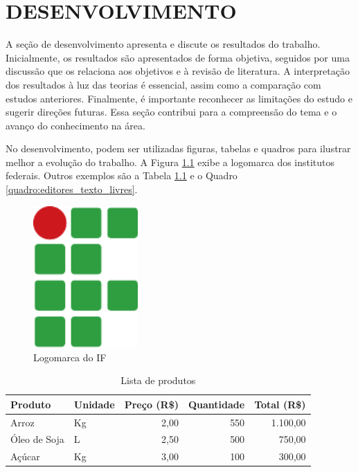 \documentclass{iftex2024}
\begin{document}
\chapter{DESENVOLVIMENTO}

A seção de desenvolvimento apresenta e discute os resultados do trabalho.
Inicialmente, os resultados são apresentados de forma objetiva, seguidos por uma discussão que os relaciona aos objetivos e à revisão de literatura.
A interpretação dos resultados à luz das teorias é essencial, assim como a comparação com estudos anteriores.
Finalmente, é importante reconhecer as limitações do estudo e sugerir direções futuras.
Essa seção contribui para a compreensão do tema e o avanço do conhecimento na área.

No desenvolvimento, podem ser utilizadas figuras, tabelas e quadros para ilustrar melhor a evolução do trabalho.
A Figura \ref{figura:logomarca_if} exibe a logomarca dos institutos federais.
Outros exemplos são a Tabela \ref{tabela:lista_produtos} e o Quadro \ref{quadro:editores_texto_livres}.

\begin{figure}[!htb] \centering
  \caption{Logomarca do IF} \label{figura:logomarca_if}
  \begin{varwidth}{\linewidth}
    \includegraphics[width=4cm]{figuras/if}
  \end{varwidth}
\end{figure}

\begin{table}[!htb]
\caption{Lista de produtos} \label{tabela:lista_produtos}
\begin{tabularx}{\textwidth}{X|l|r|r|r} \hline
Produto      & Unidade & Preço (R\$) & Quantidade & Total (R\$) \\ \hline
Arroz        & Kg      & 2,00        & 550        & 1.100,00    \\
Óleo de Soja & L       & 2,50        & 500        & 750,00      \\
Açúcar       & Kg      & 3,00        & 100        & 300,00      \\ \hline
\end{tabularx}
\end{table}
\end{document}

